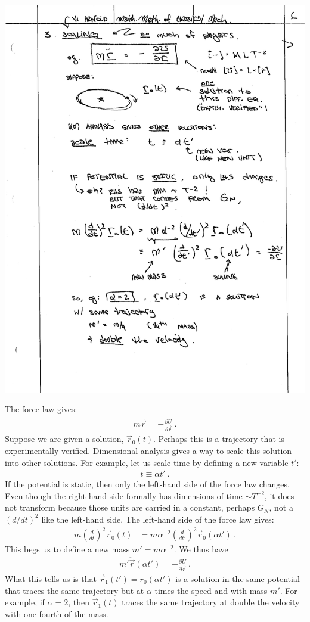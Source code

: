 \begin{center}
\includegraphics[width=.7\textwidth]{figures/lec01_orbit.pdf}
\end{center}

The force law gives:
\begin{align}
  m 
  \ddot{\vec{r}} = - \frac{\partial U}{\partial\vec{r}} \ .
\end{align}
Suppose we are given a solution, $\vec r_0(t)$. Perhaps this is a trajectory that is experimentally verified. Dimensional analysis gives a way to scale this solution into other solutions. For example, let us scale time by defining a new variable $t'$:
\begin{align}
  t \equiv \alpha t' \ .
\end{align}
If the potential is static, then only the left-hand side of the force law changes. Even though the right-hand side formally has dimensions of time $\sim T^{-2}$, it does not transform because those units are carried in a constant, perhaps $G_N$, not a $(d/dt)^2$ like the left-hand side. The left-hand side of the force law gives:
\begin{align}
  m\left(\frac{d}{dt}\right)^2 \vec r_0(t) 
  &=
  m\alpha^{-2} \left(\frac{d}{dt'}\right)^2 \vec r_0(\alpha t') \ .
\end{align}
This begs us to define a new mass $m' = m\alpha^{-2}$. We thus have
\begin{align}
   m'\ddot{\vec{r}}(\alpha t')
  = - \frac{\partial U}{\partial\vec{r}} \ .
\end{align}
What this tells us is that $\vec r_1(t') = r_0(\alpha t')$ is a solution in the same potential that traces the same trajectory but at $\alpha$ times the speed and with mass $m'$. For example, if $\alpha = 2$, then $\vec r_1(t)$ traces the same trajectory at double the velocity with one fourth of the mass. 

